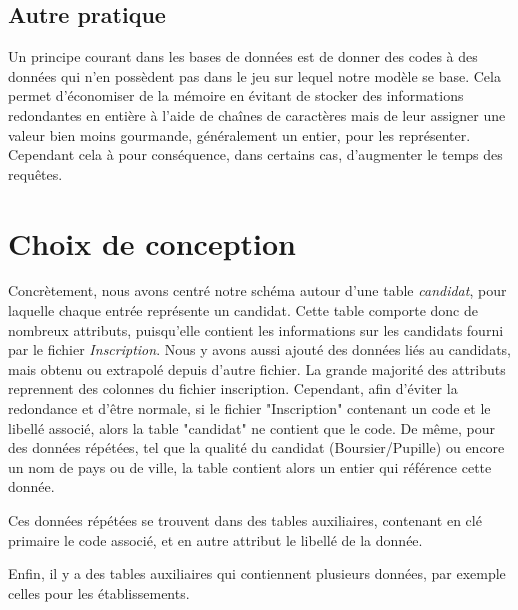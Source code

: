 \subsection{Autre pratique}
Un principe courant dans les bases de données est de donner des codes à des données qui n'en possèdent pas dans le jeu sur lequel notre modèle se base. Cela permet d'économiser de la mémoire en évitant de stocker des informations redondantes en entière à l'aide de chaînes de caractères mais de leur assigner une valeur bien moins gourmande, généralement un entier, pour les représenter. Cependant cela à pour conséquence, dans certains cas, d'augmenter le temps des requêtes. 

\section{Choix de conception}
Concrètement, nous avons centré notre schéma autour d'une table \textit{candidat}, pour laquelle chaque entrée représente un candidat. Cette table comporte donc de nombreux attributs, puisqu'elle contient les informations sur les candidats fourni par le fichier \textit{Inscription}.
Nous y avons aussi ajouté des données liés au candidats, mais obtenu ou extrapolé depuis d'autre fichier.
La grande majorité des attributs reprennent des colonnes du fichier inscription.
Cependant, afin d'éviter la redondance et d'être normale, si le fichier "Inscription" contenant un code et le libellé associé, alors la table "candidat" ne contient que le code.
De même, pour des données répétées, tel que la qualité du candidat (Boursier/Pupille) ou encore un nom de pays ou de ville, la table contient alors un entier qui référence cette donnée.

Ces données répétées se trouvent dans des tables auxiliaires, contenant en clé primaire le code associé, et en autre attribut le libellé de la donnée.

Enfin, il y a des tables auxiliaires qui contiennent plusieurs données, par exemple celles pour les établissements.